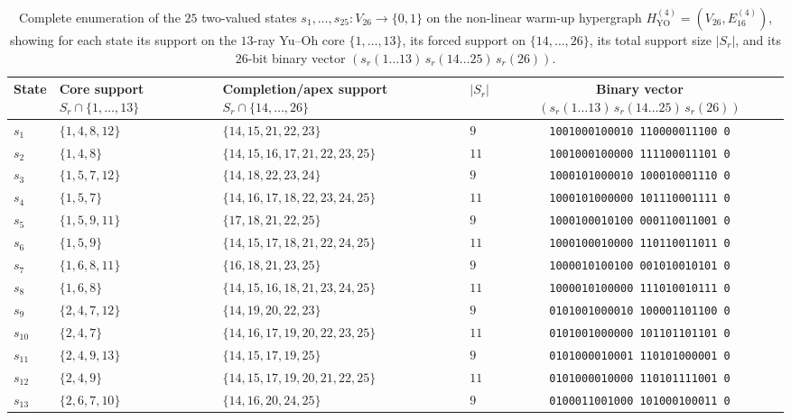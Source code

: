 \documentclass[
  aps,
  pra,
  reprint,
  superscriptaddress,
  amsmath,
  amssymb,
  nofootinbib,
  floatfix
]{revtex4-2}
\theoremstyle{definition}
\theoremstyle{remark}
\newcommand{\YO}{\mathrm{YO}}
\begin{document}
\begin{table}[t]
\caption{Complete enumeration of the $25$ two-valued states $s_1,\ldots,s_{25}:V_{26}\to\{0,1\}$ on the non-linear warm-up hypergraph $H_{\YO}^{(4)}=(V_{26},E_{16}^{(4)})$, showing for each state its support on the $13$-ray Yu--Oh core $\{1,\ldots,13\}$, its forced support on $\{14,\ldots,26\}$, its total support size $|S_r|$, and its $26$-bit binary vector $(s_r(1\ldots 13)\,s_r(14\ldots 25)\,s_r(26))$.}\label{tab:app-hyo4-states}
\scriptsize
\begin{ruledtabular}
\begin{tabular}{llllc}
State & Core support $S_r\cap\{1,\ldots,13\}$ & Completion/apex support $S_r\cap\{14,\ldots,26\}$ & $|S_r|$ & Binary vector $(s_r(1\ldots 13)\,s_r(14\ldots 25)\,s_r(26))$ \\ \hline
$s_{1}$ & $\{1,4,8,12\}$ & $\{14,15,21,22,23\}$ & $9$ & \texttt{1001000100010\,110000011100\,0} \\
$s_{2}$ & $\{1,4,8\}$ & $\{14,15,16,17,21,22,23,25\}$ & $11$ & \texttt{1001000100000\,111100011101\,0} \\
$s_{3}$ & $\{1,5,7,12\}$ & $\{14,18,22,23,24\}$ & $9$ & \texttt{1000101000010\,100010001110\,0} \\
$s_{4}$ & $\{1,5,7\}$ & $\{14,16,17,18,22,23,24,25\}$ & $11$ & \texttt{1000101000000\,101110001111\,0} \\
$s_{5}$ & $\{1,5,9,11\}$ & $\{17,18,21,22,25\}$ & $9$ & \texttt{1000100010100\,000110011001\,0} \\
$s_{6}$ & $\{1,5,9\}$ & $\{14,15,17,18,21,22,24,25\}$ & $11$ & \texttt{1000100010000\,110110011011\,0} \\
$s_{7}$ & $\{1,6,8,11\}$ & $\{16,18,21,23,25\}$ & $9$ & \texttt{1000010100100\,001010010101\,0} \\
$s_{8}$ & $\{1,6,8\}$ & $\{14,15,16,18,21,23,24,25\}$ & $11$ & \texttt{1000010100000\,111010010111\,0} \\
$s_{9}$ & $\{2,4,7,12\}$ & $\{14,19,20,22,23\}$ & $9$ & \texttt{0101001000010\,100001101100\,0} \\
$s_{10}$ & $\{2,4,7\}$ & $\{14,16,17,19,20,22,23,25\}$ & $11$ & \texttt{0101001000000\,101101101101\,0} \\
$s_{11}$ & $\{2,4,9,13\}$ & $\{14,15,17,19,25\}$ & $9$ & \texttt{0101000010001\,110101000001\,0} \\
$s_{12}$ & $\{2,4,9\}$ & $\{14,15,17,19,20,21,22,25\}$ & $11$ & \texttt{0101000010000\,110101111001\,0} \\
$s_{13}$ & $\{2,6,7,10\}$ & $\{14,16,20,24,25\}$ & $9$ & \texttt{0100011001000\,101000100011\,0} \\

\end{tabular}
\end{ruledtabular}
\end{table}
\end{document}

